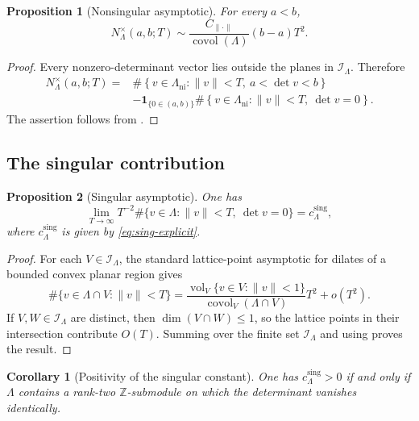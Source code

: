 \documentclass[reqno,11pt]{amsart}
\newtheorem{prop}[prop]{Proposition}
\newtheorem{cor}[cor]{Corollary}
\theoremstyle{definition}
\theoremstyle{remark}
\numberwithin{equation}{section}
\newcommand{\vol}{\operatorname{vol}}
\newcommand{\covol}{\operatorname{covol}}
\begin{document}
\begin{prop}[Nonsingular asymptotic]
\label{prop:nonsingular-d2}
For every $a<b$,
$$
N_\Lambda^\times(a,b;T)
\sim
\frac{C_{\|\cdot\|}}{\covol(\Lambda)}
(b-a)T^2.
$$
\end{prop}

\begin{proof}
Every nonzero-determinant vector lies outside the planes in
$\mathcal I_\Lambda$. Therefore
$$
\begin{aligned}
N_\Lambda^\times(a,b;T)
={}&
\#\left\{
v\in\Lambda_{\operatorname{ni}}:
\|v\|<T,\ a<\det v<b
\right\}\\
&-
\mathbf 1_{\{0\in(a,b)\}}
\#\left\{
v\in\Lambda_{\operatorname{ni}}:
\|v\|<T,\ \det v=0
\right\}.
\end{aligned}
$$
The assertion follows from
.
\end{proof}

\subsection{The singular contribution}
\label{sec:singular-d2}

\begin{prop}[Singular asymptotic]
\label{prop:singular-d2}
One has
$$
\lim_{T\to\infty}
T^{-2}
\#\{v\in\Lambda:\|v\|<T,\ \det v=0\}
=
c_\Lambda^{\operatorname{sing}},
$$
where $c_\Lambda^{\operatorname{sing}}$ is given by
\eqref{eq:sing-explicit}.
\end{prop}

\begin{proof}
For each $V\in\mathcal I_\Lambda$, the standard lattice-point asymptotic
for dilates of a bounded convex planar region gives
$$
\#\{v\in\Lambda\cap V:\|v\|<T\}
=
\frac{\vol_V\{v\in V:\|v\|<1\}}
{\covol_V(\Lambda\cap V)}
T^2
+
o(T^2).
$$
If $V,W\in\mathcal I_\Lambda$ are distinct, then
$\dim(V\cap W)\le1$, so the lattice points in their intersection contribute
$O(T)$. Summing over the finite set $\mathcal I_\Lambda$ and using
 proves the result.
\end{proof}

\begin{cor}[Positivity of the singular constant]
\label{cor:singular-positivity-d2}
One has $c_\Lambda^{\operatorname{sing}}>0$ if and only if $\Lambda$ contains a
rank-two $\mathbb Z$-submodule on which the determinant vanishes
identically.
\end{cor}
\end{document}
